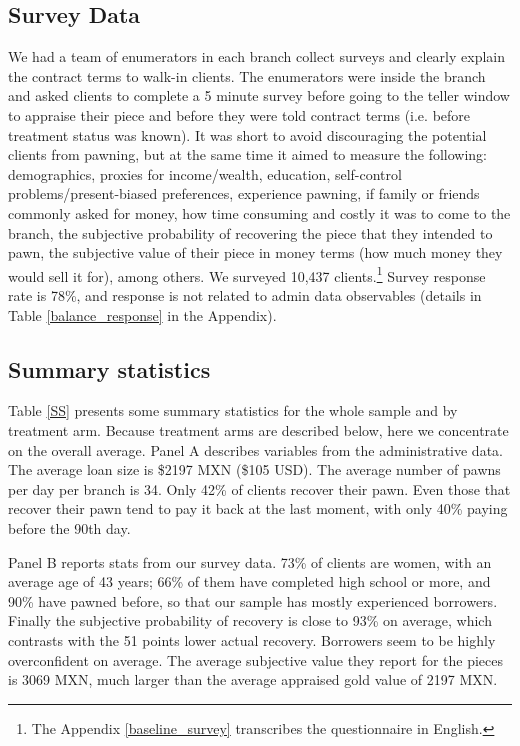 \documentclass[oneside,11pt]{article}
\begin{document}
\subsection{Survey Data} 

We had a team of enumerators in each branch collect surveys and clearly explain the contract terms to walk-in clients. The enumerators were inside the branch and asked clients to complete a 5 minute survey before going to the teller window to appraise their piece and before they were told contract terms (i.e. before treatment status was known). It was short to avoid discouraging the potential clients from pawning, but at the same time it aimed to measure the following: demographics, proxies for income/wealth, education, self-control problems/present-biased preferences, experience pawning, if family or friends commonly asked for money, how time consuming and costly it was to come to the branch, the subjective probability of recovering the piece that they intended to pawn, the subjective value of their piece in money terms (how much money they would sell it for), among others. We surveyed 10,437 clients.\footnote{The Appendix \ref{baseline_survey} transcribes the questionnaire in English.} %
Survey response rate is 78\%, and response is not related to admin data observables (details in Table \ref{balance_response} in the Appendix).


\subsection{Summary statistics}

Table \ref{SS} presents some summary statistics for the whole sample and by treatment arm. Because treatment arms are described below, here we concentrate on the overall average. Panel A describes variables from the administrative data. The average loan size is \$2197 MXN (\$105 USD). The average number of pawns per day per branch is 34. Only 42\% of clients recover their pawn. Even those that recover their pawn tend to pay it back at the last moment, with only 40\% paying before the 90th day.

Panel B reports stats from our survey data. 73\% of clients are women, with an average age of 43 years; 66\% of them have completed high school or more, and 90\% have pawned before, so that our sample has mostly experienced borrowers. Finally the subjective probability of recovery is close to 93\% on average, which contrasts with the 51 points lower actual recovery. Borrowers seem to be highly overconfident on average. The average subjective value they report for the pieces is 3069 MXN, much larger than the average appraised gold value of 2197 MXN. %
\end{document}
